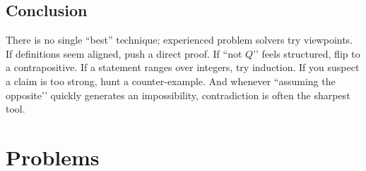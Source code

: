\subsection{Conclusion}
There is no single ``best'' technique; experienced problem solvers try viewpoints. If definitions seem aligned, push a direct proof. If ``not \(Q\)’’ feels structured, flip to a contrapositive. If a statement ranges over integers, try induction. If you suspect a claim is too strong, hunt a counter-example. And whenever “assuming the opposite’’ quickly generates an impossibility, contradiction is often the sharpest tool.

\section*{Problems}


